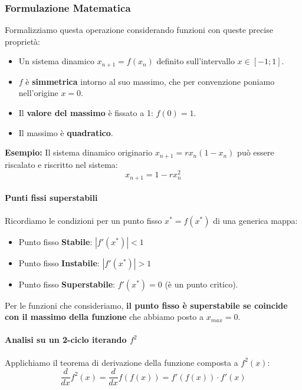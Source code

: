\documentclass[openany]{book}
\theoremstyle{definition}
\theoremstyle{remark}
\begin{document}
\subsubsection*{Formulazione Matematica}

Formalizziamo questa operazione considerando funzioni con queste precise proprietà:
\begin{itemize}
    \item Un sistema dinamico $x_{n+1} = f(x_n)$ definito sull'intervallo $x \in [-1; 1]$.
    \item $f$ è \textbf{simmetrica} intorno al suo massimo, che per convenzione poniamo nell'origine $x=0$.
    \item Il \textbf{valore del massimo} è fissato a 1: $f(0) = 1$.
    \item Il massimo è \textbf{quadratico}.
\end{itemize}

\textbf{Esempio:}
Il sistema dinamico originario $x_{n+1} = r x_n(1-x_n)$ può essere riscalato e riscritto nel sistema: 
\begin{equation}
    x_{n+1} = 1 - r x_n^2
\end{equation}

\paragraph{Punti fissi superstabili}
Ricordiamo le condizioni per un punto fisso $x^* = f(x^*)$ di una generica mappa:
\begin{itemize}
    \item Punto fisso \textbf{Stabile}: $|f'(x^*)| < 1$
    \item Punto fisso \textbf{Instabile}: $|f'(x^*)| > 1$
    \item Punto fisso \textbf{Superstabile}: $f'(x^*) = 0$ (è un punto critico).
\end{itemize}

Per le funzioni che consideriamo, \textbf{il punto fisso è superstabile se coincide con il massimo della funzione} che abbiamo posto a $x_{max} = 0$.

\paragraph{Analisi su un 2-ciclo iterando $f^2$}
Applichiamo il teorema di derivazione della funzione composta a $f^2(x)$:
\begin{equation}
    \frac{d}{dx} f^2(x) = \frac{d}{dx} f(f(x)) = f'(f(x)) \cdot f'(x)
\end{equation}
\end{document}

